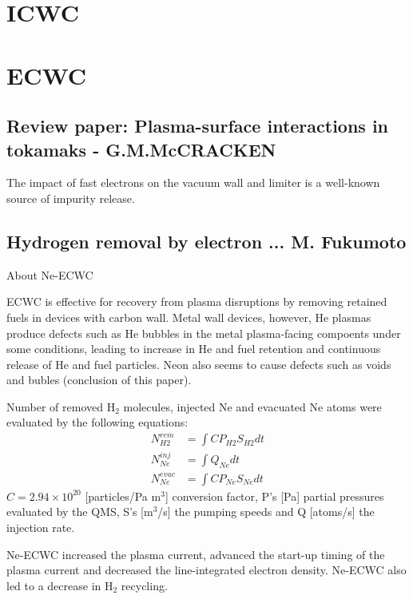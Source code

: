 \section{ICWC}
\section{ECWC}
\subsection{Review paper: Plasma-surface interactions in tokamaks - G.M.McCRACKEN}
The impact of fast electrons on the vacuum wall and limiter is a well-known source of impurity release.
\subsection{Hydrogen removal by electron ... M. Fukumoto}
About Ne-ECWC

ECWC is effective for recovery from plasma disruptions by removing retained fuels in devices with carbon wall. Metal wall devices, however, He plasmas produce defects such as He bubbles in the metal plasma-facing compoents under some conditions, leading to increase in He and fuel retention and continuous release of He and fuel particles. Neon also seems to cause defects such as voids and bubles (conclusion of this paper).

Number of removed H$_2$ molecules, injected Ne and evacuated Ne atoms were evaluated by the following equations:
\begin{align}
    N^{rem}_{H2} &= \int C P_{H2} S_{H2}dt\\
    N^{inj}_{Ne} &= \int Q_{Ne}dt\\
    N^{evac}_{Ne} &= \int C P_{Ne} S_{Ne}dt
\end{align}
$C = 2.94\times 10^{20}$ [particles/Pa m$^3$] conversion factor, P's [Pa] partial pressures evaluated by the QMS, S's [m$^3$/s] the pumping speeds and Q [atoms/s] the injection rate.

Ne-ECWC increased the plasma current, advanced the start-up timing of the plasma current and decreased the line-integrated electron density.
Ne-ECWC also led to a decrease in H$_2$ recycling.


